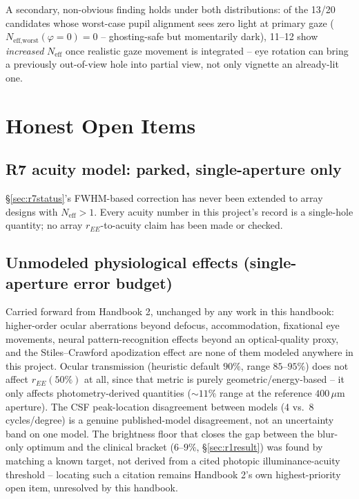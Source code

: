 \documentclass[11pt]{report}
\newcommand{\Neff}{N_{\text{eff}}}
\begin{document}
A secondary, non-obvious finding holds under both distributions: of the 13/20 candidates
whose worst-case pupil alignment sees zero light at primary gaze ($N_{\text{eff,worst}}
(\varphi{=}0){=}0$ -- ghosting-safe but momentarily dark), 11--12 show \emph{increased}
$\Neff$ once realistic gaze movement is integrated -- eye rotation can bring a previously
out-of-view hole into partial view, not only vignette an already-lit one.

\chapter{Honest Open Items}
\label{ch:openitems}

\section{R7 acuity model: parked, single-aperture only}
\label{sec:openr7}
\S\ref{sec:r7status}'s FWHM-based correction has never been extended to array designs with
$\Neff>1$. Every acuity number in this project's record is a single-hole quantity; no array
$r_{EE}$-to-acuity claim has been made or checked.

\section{Unmodeled physiological effects (single-aperture error budget)}
Carried forward from Handbook 2, unchanged by any work in this handbook: higher-order ocular
aberrations beyond defocus, accommodation, fixational eye movements, neural
pattern-recognition effects beyond an optical-quality proxy, and the Stiles--Crawford
apodization effect are none of them modeled anywhere in this project. Ocular transmission
(heuristic default $90\%$, range $85$--$95\%$) does not affect $r_{EE}(50\%)$ at all, since
that metric is purely geometric/energy-based -- it only affects photometry-derived
quantities ($\sim11\%$ range at the reference $400\,\mu$m aperture). The CSF peak-location
disagreement between models (4 vs.\ 8 cycles/degree) is a genuine published-model
disagreement, not an uncertainty band on one model. The brightness floor that closes the gap
between the blur-only optimum and the clinical bracket ($6$--$9\%$, \S\ref{sec:r1result}) was
found by matching a known target, not derived from a cited photopic illuminance-acuity
threshold -- locating such a citation remains Handbook 2's own highest-priority open item,
unresolved by this handbook.
\end{document}

